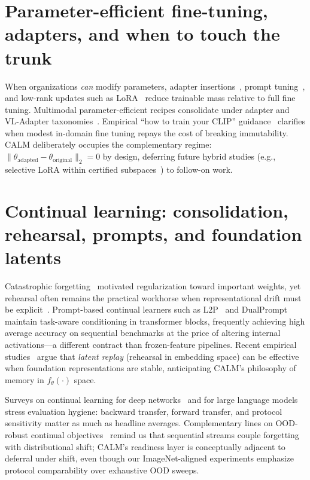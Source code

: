 \documentclass[12pt,a4paper]{report}
\begin{document}
\section{Parameter-efficient fine-tuning, adapters, and when to touch the trunk}
When organizations \emph{can} modify parameters, adapter insertions~\cite{r12}, prompt tuning~\cite{r11}, and low-rank updates such as LoRA~\cite{r13} reduce trainable mass relative to full fine tuning. Multimodal parameter-efficient recipes consolidate under adapter and VL-Adapter taxonomies~\cite{r14,r15}. Empirical ``how to train your CLIP'' guidance~\cite{r16} clarifies when modest in-domain fine tuning repays the cost of breaking immutability. CALM deliberately occupies the complementary regime: $\|\theta_{\text{adapted}}-\theta_{\text{original}}\|_2=0$ by design, deferring future hybrid studies (e.g., selective LoRA within certified subspaces~\cite{r13}) to follow-on work.

\section{Continual learning: consolidation, rehearsal, prompts, and foundation latents}
Catastrophic forgetting~\cite{r6} motivated regularization toward important weights, yet rehearsal often remains the practical workhorse when representational drift must be explicit~\cite{r7}. Prompt-based continual learners such as L2P~\cite{r17} and DualPrompt~\cite{r8} maintain task-aware conditioning in transformer blocks, frequently achieving high average accuracy on sequential benchmarks at the price of altering internal activations---a different contract than frozen-feature pipelines. Recent empirical studies~\cite{r9} argue that \emph{latent replay} (rehearsal in embedding space) can be effective when foundation representations are stable, anticipating CALM's philosophy of memory in $f_\theta(\cdot)$ space.

Surveys on continual learning for deep networks~\cite{r19} and for large language models~\cite{r18} stress evaluation hygiene: backward transfer, forward transfer, and protocol sensitivity matter as much as headline averages. Complementary lines on OOD-robust continual objectives~\cite{r20} remind us that sequential streams couple forgetting with distributional shift; CALM's readiness layer is conceptually adjacent to deferral under shift, even though our ImageNet-aligned experiments emphasize protocol comparability over exhaustive OOD sweeps.
\end{document}
